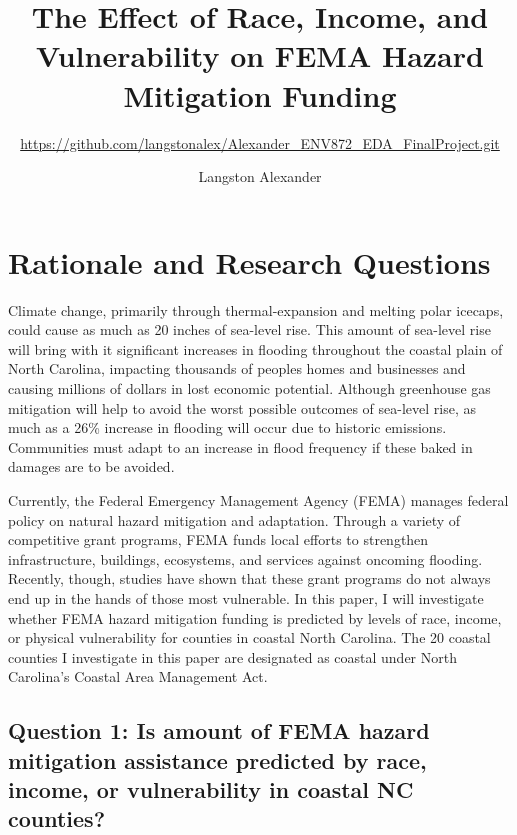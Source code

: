 \documentclass[
  12pt,
]{article}
\title{The Effect of Race, Income, and Vulnerability on FEMA Hazard
Mitigation Funding}
\subtitle{\url{https://github.com/langstonalex/Alexander_ENV872_EDA_FinalProject.git}}
\author{Langston Alexander}
\date{}
\begin{document}
\maketitle

\newpage
\tableofcontents 
\newpage
\listoftables 
\newpage
\listoffigures 
\newpage

\hypertarget{rationale-and-research-questions}{%
\section{Rationale and Research
Questions}\label{rationale-and-research-questions}}

Climate change, primarily through thermal-expansion and melting polar
icecaps, could cause as much as 20 inches of sea-level rise. This amount
of sea-level rise will bring with it significant increases in flooding
throughout the coastal plain of North Carolina, impacting thousands of
peoples homes and businesses and causing millions of dollars in lost
economic potential. Although greenhouse gas mitigation will help to
avoid the worst possible outcomes of sea-level rise, as much as a 26\%
increase in flooding will occur due to historic emissions. Communities
must adapt to an increase in flood frequency if these baked in damages
are to be avoided.

Currently, the Federal Emergency Management Agency (FEMA) manages
federal policy on natural hazard mitigation and adaptation. Through a
variety of competitive grant programs, FEMA funds local efforts to
strengthen infrastructure, buildings, ecosystems, and services against
oncoming flooding. Recently, though, studies have shown that these grant
programs do not always end up in the hands of those most vulnerable. In
this paper, I will investigate whether FEMA hazard mitigation funding is
predicted by levels of race, income, or physical vulnerability for
counties in coastal North Carolina. The 20 coastal counties I
investigate in this paper are designated as coastal under North
Carolina's Coastal Area Management Act.

\hypertarget{question-1-is-amount-of-fema-hazard-mitigation-assistance-predicted-by-race-income-or-vulnerability-in-coastal-nc-counties}{%
\subsection{Question 1: Is amount of FEMA hazard mitigation assistance
predicted by race, income, or vulnerability in coastal NC
counties?}\label{question-1-is-amount-of-fema-hazard-mitigation-assistance-predicted-by-race-income-or-vulnerability-in-coastal-nc-counties}}
\end{document}
